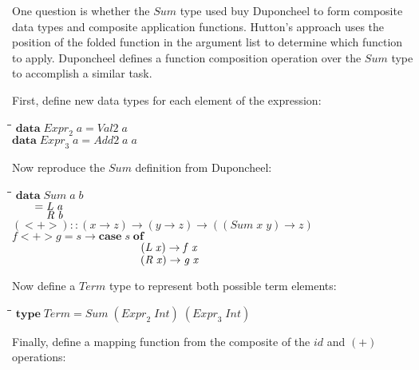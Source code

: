 \documentclass[10pt]{article}
\newlength{\lwidth}\setlength{\lwidth}{4.5cm}
\newlength{\cwidth}\setlength{\cwidth}{8mm} %
\newcommand{\Conid}[1]{\mathit{#1}}
\newcommand{\Varid}[1]{\mathit{#1}}
\begin{document}
One question is whether the \ensuremath{\Conid{Sum}} type used buy Duponcheel to form
composite data types and composite application functions.  Hutton's
approach uses the position of the folded function in the argument list
to determine which function to apply.  Duponcheel defines a function
composition operation over the \ensuremath{\Conid{Sum}} type to accomplish a similar task.

First, define new data types for each element of the expression:

\begin{tabbing}
\qquad\=\hspace{\lwidth}\=\hspace{\cwidth}\=\+\kill
${\mathbf{data}\;\Varid{Expr}_2\;\Varid{a}\mathrel{=}\Conid{Val2}\;\Varid{a}}$\\
${\mathbf{data}\;\Varid{Expr}_3\;\Varid{a}\mathrel{=}\Conid{Add2}\;\Varid{a}\;\Varid{a}}$
\end{tabbing}
Now reproduce the \ensuremath{\Conid{Sum}} definition from Duponcheel:

\begin{tabbing}
\qquad\=\hspace{\lwidth}\=\hspace{\cwidth}\=\+\kill
${\mathbf{data}\;\Conid{Sum}\;\Varid{a}\;\Varid{b}}$\\
${\hskip2.00em\relax\mathrel{=}\Conid{L}\;\Varid{a}}$\\
${\hskip2.00em\relax\phantom{\mathrel{=}\mbox{}}\Conid{R}\;\Varid{b}}$\\
${}$\\
${(\mathbin{<+>})\mathbin{::}(\Varid{x}\to \Varid{z})\to (\Varid{y}\to \Varid{z})\to ((\Conid{Sum}\;\Varid{x}\;\Varid{y})\to \Varid{z})}$\\
${\Varid{f}\mathbin{<+>}\Varid{g}\mathrel{=}\Varid{s}\to \mathbf{case}\;\Varid{s}\;\mathbf{of}}$\\
${\hskip11.50em\relax(\Conid{L}\;\Varid{x})\to \Varid{f}\;\Varid{x}}$\\
${\hskip11.50em\relax(\Conid{R}\;\Varid{x})\to \Varid{g}\;\Varid{x}}$
\end{tabbing}
Now define a \ensuremath{\Conid{Term}} type to represent both possible term elements:

\begin{tabbing}
\qquad\=\hspace{\lwidth}\=\hspace{\cwidth}\=\+\kill
${\mathbf{type}\;\Conid{Term}\mathrel{=}\Conid{Sum}\;(\Varid{Expr}_2\;\Conid{Int})\;(\Varid{Expr}_3\;\Conid{Int})}$
\end{tabbing}
Finally, define a mapping function from the composite of the \ensuremath{\Varid{id}} and
\ensuremath{(\mathbin{+})} operations:
\end{document}
